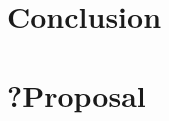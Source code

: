 \documentclass[18pt]{article}
\numberwithin{equation}{section} %
\numberwithin{figure}{section} %
\numberwithin{table}{section} %
\begin{document}
	
	
	
\section{Conclusion}	
\section{?Proposal}	
	
	

\newpage
\begin{flushleft}



\end{flushleft}
\end{document}
